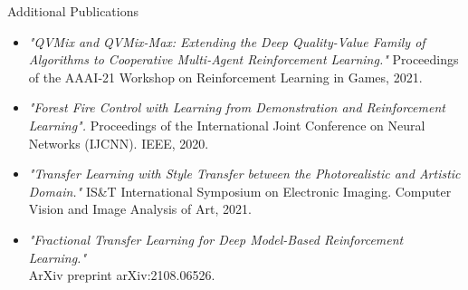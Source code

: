\begin{takeaway}{Additional Publications}
\begin{itemize}
	\item \citet{leroy21qvmix} \textit{"QVMix and QVMix-Max: Extending the Deep Quality-Value Family of Algorithms to Cooperative Multi-Agent Reinforcement Learning."} Proceedings of the AAAI-21 Workshop on Reinforcement Learning in Games, 2021. 
	\item \citet{hammond2020forest} \textit{"Forest Fire Control with Learning from Demonstration and Reinforcement Learning".} Proceedings of the International Joint Conference on Neural Networks (IJCNN). IEEE, 2020.
	\item \citet{banartransfer} \textit{"Transfer Learning with Style Transfer between the Photorealistic and Artistic Domain."} IS\&T International Symposium on Electronic Imaging. Computer Vision and Image Analysis of Art, 2021.
	\item \citet{sasso2021fractional} \textit{"Fractional Transfer Learning for Deep Model-Based Reinforcement Learning."} \\ ArXiv preprint arXiv:2108.06526. 

\end{itemize}
\end{takeaway}
